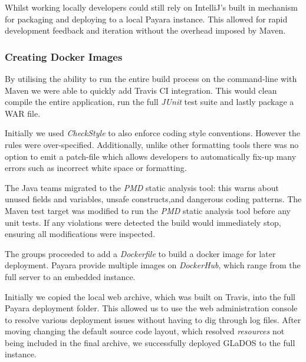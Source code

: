         \par
        Whilst working locally developers could still rely on IntelliJ's built in mechanism for packaging and deploying to a local Payara instance. This allowed for rapid development feedback and iteration without the overhead imposed by Maven.

        \subsubsection{Creating Docker Images}
        \par
        By utilising the ability to run the entire build process on the command-line with Maven we were able to quickly add Travis CI integration. This would clean compile the entire application, run the full \textit{JUnit} test suite and lastly package a WAR file.

        \par
        Initially we used \textit{CheckStyle} to also enforce coding style conventions. However the rules were over-specified. Additionally, unlike other formatting tools there was no option to emit a patch-file which allows developers to automatically fix-up many errors such as incorrect white space or formatting.

        \par
        The Java teams migrated to the \textit{PMD}\cite{PMD} static analysis tool: this warns about unused fields and variables, unsafe constructs,and dangerous coding patterns.
        The Maven test target was modified to run the \textit{PMD}\cite{PMD} static analysis tool before any unit tests. If any violations were detected the build would immediately stop, ensuring all modifications were inspected.

        \par
        The groups proceeded to add a \textit{Dockerfile} to build a docker image for later deployment. Payara provide multiple images on \textit{DockerHub}\cite{DockerHub_Payara}, which range from the full server to an embedded instance.

        \par
        Initially we copied the local web archive, which was built on Travis, into the full Payara deployment folder. This allowed us to use the web administration console to resolve various deployment issues without having to dig through log files. After moving changing the default source code layout, which resolved \textit{resources} not being included in the final archive, we successfully deployed GLaDOS to the full instance.

